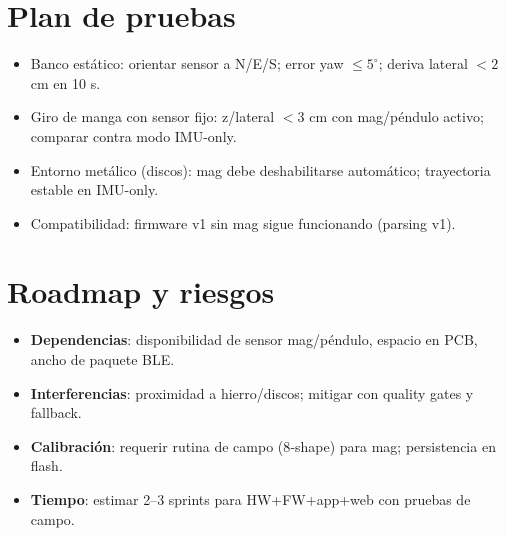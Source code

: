 \documentclass[11pt,a4paper]{article}
\begin{document}
\section{Plan de pruebas}
\begin{itemize}[leftmargin=12pt]
  \item Banco est\'atico: orientar sensor a N/E/S; error yaw \(\le 5^\circ\); deriva lateral \(<2\) cm en 10 s.
  \item Giro de manga con sensor fijo: z/lateral \(<3\) cm con mag/p\'endulo activo; comparar contra modo IMU-only.
  \item Entorno met\'alico (discos): mag debe deshabilitarse autom\'atico; trayectoria estable en IMU-only.
  \item Compatibilidad: firmware v1 sin mag sigue funcionando (parsing v1).
\end{itemize}

\section{Roadmap y riesgos}
\begin{itemize}[leftmargin=12pt]
  \item \textbf{Dependencias}: disponibilidad de sensor mag/p\'endulo, espacio en PCB, ancho de paquete BLE.
  \item \textbf{Interferencias}: proximidad a hierro/discos; mitigar con quality gates y fallback.
  \item \textbf{Calibraci\'on}: requerir rutina de campo (8‑shape) para mag; persistencia en flash.
  \item \textbf{Tiempo}: estimar 2–3 sprints para HW+FW+app+web con pruebas de campo.
\end{itemize}
\end{document}
